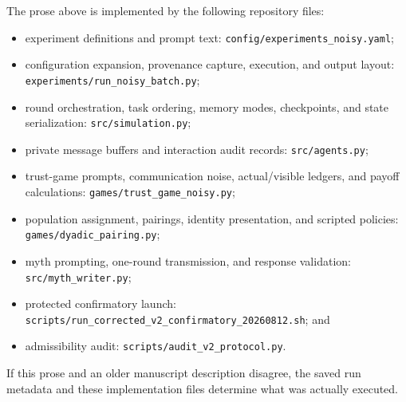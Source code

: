 The prose above is implemented by the following repository files:
\begin{itemize}
    \item experiment definitions and prompt text:
    \texttt{config/experiments\_noisy.yaml};
    \item configuration expansion, provenance capture, execution, and output
    layout: \texttt{experiments/run\_noisy\_batch.py};
    \item round orchestration, task ordering, memory modes, checkpoints, and
    state serialization: \texttt{src/simulation.py};
    \item private message buffers and interaction audit records:
    \texttt{src/agents.py};
    \item trust-game prompts, communication noise, actual/visible ledgers, and
    payoff calculations: \texttt{games/trust\_game\_noisy.py};
    \item population assignment, pairings, identity presentation, and scripted
    policies: \texttt{games/dyadic\_pairing.py};
    \item myth prompting, one-round transmission, and response validation:
    \texttt{src/myth\_writer.py};
    \item protected confirmatory launch:
    \texttt{scripts/run\_corrected\_v2\_confirmatory\_20260812.sh}; and
    \item admissibility audit: \texttt{scripts/audit\_v2\_protocol.py}.
\end{itemize}
If this prose and an older manuscript description disagree, the saved run
metadata and these implementation files determine what was actually executed.

